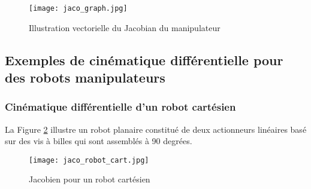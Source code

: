 \begin{figure}[H]
\vspace{-5pt}
	\centering
		\texttt{[image: jaco\_graph.jpg]}
	\caption{Illustration vectorielle du Jacobian du manipulateur}
	\vspace{-5pt}
	\label{fig:jaco_graph}
\end{figure}



\subsection{Exemples de cinématique différentielle pour des robots manipulateurs}

\subsubsection{Cinématique différentielle d'un robot cartésien}

La Figure \ref{fig:jaco_robot_cart} illustre un robot planaire constitué de deux actionneurs linéaires basé sur des vis à billes qui sont assemblés à 90 degrées. 
\begin{figure}[H]
	\vspace{-5pt}
	\centering
		\texttt{[image: jaco\_robot\_cart.jpg]}
	\caption{Jacobien pour un robot cartésien}
	\vspace{-5pt}
	\label{fig:jaco_robot_cart}
\end{figure}

